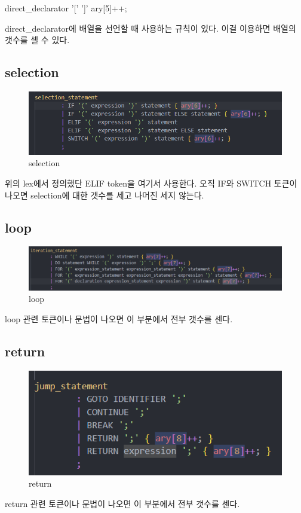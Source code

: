 \documentclass{article}
\begin{document}
direct\_declarator '[' ']' { ary[5]++; }

direct\_declarator에 배열을 선언할 때 사용하는 규칙이 있다. 이걸 이용하면 배열의 갯수를 셀 수 있다.

\newpage

\subsection{selection}
\begin{figure}[h]
    \centering
    \includegraphics[scale = 0.8]{selection.png}
    \caption{selection}
\end{figure}
위의 lex에서 정의했단 ELIF token을 여기서 사용한다. 오직 IF와 SWITCH 토큰이 나오면 selection에 대한 갯수를 세고 나머진 세지 않는다.

\subsection{loop}
\begin{figure}[h]
    \centering
    \includegraphics[scale = 0.8]{loop.png}
    \caption{loop}
\end{figure}
loop 관련 토큰이나 문법이 나오면 이 부분에서 전부 갯수를 센다.

\subsection{return}
\begin{figure}[h]
    \centering
    \includegraphics[scale = 0.8]{return.png}
    \caption{return}
\end{figure}
return 관련 토큰이나 문법이 나오면 이 부분에서 전부 갯수를 센다.
\end{document}
